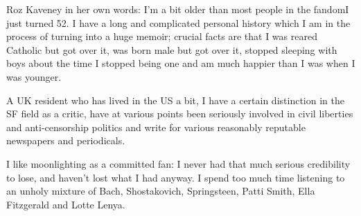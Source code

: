 {Roz Kaveney} in her own words: I'm a bit older than most people in the
fandom\textemdash I just turned 52. I have a long and complicated
personal history which I am in the process of turning into a huge
memoir; crucial facts are that I was reared Catholic but got over it,
was born male but got over it, stopped sleeping with boys about the
time I stopped being one and am much happier than I was when I was
younger.

A UK resident who has lived in the US a bit, I have a certain
distinction in the SF field as a critic, have at various points been
seriously involved in civil liberties and anti-censorship politics and
write for various reasonably reputable newspapers and periodicals.

I like moonlighting as a committed fan: I never had that much serious
credibility to lose, and haven't lost what I had anyway. I spend too
much time listening to an unholy mixture of Bach, Shostakovich,
Springsteen, Patti Smith, Ella Fitzgerald and Lotte Lenya.
